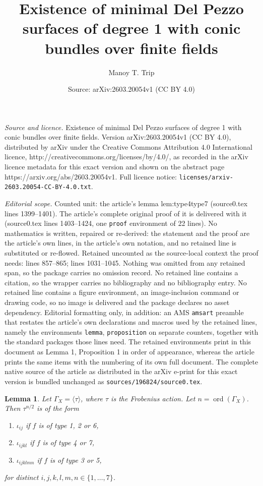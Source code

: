 \documentclass[10pt,a4paper]{amsart}
\title{Existence of minimal Del Pezzo surfaces of degree 1 with conic bundles over finite fields}
\author{Manoy T. Trip}
\date{Source: arXiv:2603.20054v1 (CC BY 4.0)}
\newtheorem{lemma}{Lemma}
\DeclareMathOperator{\ord}{ord}
\begin{document}
\maketitle

\noindent\emph{Source and licence.} Existence of minimal Del Pezzo surfaces of degree 1 with conic bundles over finite fields. Version arXiv:2603.20054v1 (CC BY 4.0), distributed by arXiv under the Creative Commons Attribution 4.0 International licence, http://creativecommons.org/licenses/by/4.0/, as recorded in the arXiv licence metadata for this exact version and shown on the abstract page https://arxiv.org/abs/2603.20054v1. Full licence notice: \texttt{licenses/arxiv-2603.20054-CC-BY-4.0.txt}.\par\smallskip

\noindent\textit{Editorial scope.} Counted unit: the article's lemma lem:type4type7 (source0.tex lines 1399--1401). The article's complete original proof of it is delivered with it (source0.tex lines 1403--1424, one \texttt{proof} environment of 22 lines). No mathematics is written, repaired or re-derived: the statement and the proof are the article's own lines, in the article's own notation, and no retained line is substituted or re-flowed.  Retained uncounted as the source-local context the proof needs: lines 857--865; lines 1031--1045.  Nothing was omitted from any retained span, so the package carries no omission record.  No retained line contains a citation, so the wrapper carries no bibliography and no bibliography entry.  No retained line contains a figure environment, an image-inclusion command or drawing code, so no image is delivered and the package declares no asset dependency.  Editorial formatting only, in addition: an AMS \texttt{amsart} preamble that restates the article's own declarations and macros used by the retained lines, namely the environments \texttt{lemma}, \texttt{proposition} on separate counters, together with the standard packages those lines need.  The retained environments print in this document as Lemma 1, Proposition 1 in order of appearance, whereas the article prints the same items with the numbering of its own full document.  The complete native source of the article as distributed in the arXiv e-print for this exact version is bundled unchanged as \texttt{sources/196824/source0.tex}.
\begin{lemma}\label{lem:galoisorbitnn/2}
    Let $\Gamma_X = \langle \tau \rangle$, where $\tau$ is the Frobenius action. Let $n = \ord(\Gamma_X)$. Then $\tau^{n/2}$ is of the form
    \begin{enumerate}
        \item $\iota_{ij}$ if $f$ is of type 1, 2 or 6,
        \item $\iota_{ijkl}$ if $f$ is of type 4 or 7,
        \item $\iota_{ijklmn}$ if $f$ is of type 3 or 5, 
    \end{enumerate}
    for distinct $i, j, k, l, m, n \in \{1, \ldots, 7\}$.
\end{lemma}
\end{document}
